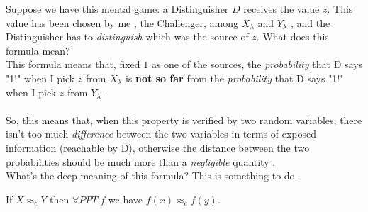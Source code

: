 Suppose we have this mental game: a Distinguisher $D$ receives the value $z$.
This value has been chosen by me , the Challenger, among $X_{\lambda}$ and
$Y_{\lambda}$ , and the Distinguisher has to \textit{distinguish} which was the
source of $z$.
What does this formula mean?\\
This formula means that, fixed $1$ as one of the sources, the
\textit{probability}  that D says "1!" when I pick $z$ from $X_{\lambda}$ is \textbf{not
so far}  from the \textit{probability}  that D says "1!" when I pick $z$ from
$Y_{\lambda}$ .\\
\\
So, this means that, when this property is verified by two random variables, 
there isn't too much \textit{difference} between the two
variables in terms of exposed information (reachable by D), otherwise the distance 
between the two probabilities should be much more than a \textit{negligible}
quantity .\\
What's the deep meaning of this formula? This is something to do.

\begin{lemma}\label{lem:tria}
    If $X \approx_{c} Y  $ then $ \forall PPT. f$  we have $f(x) \approx_{c}
    f(y)$.
\end{lemma}

